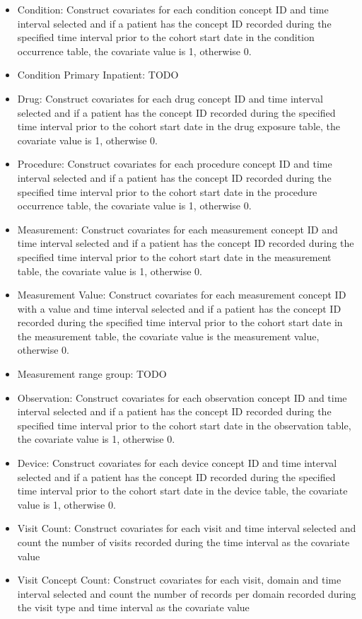 \documentclass[11pt]{book}
\providecommand{\tightlist}{%
  \setlength{\itemsep}{0pt}\setlength{\parskip}{0pt}}
\theoremstyle{definition}
\theoremstyle{definition}
\theoremstyle{definition}
\theoremstyle{remark}
\begin{document}
\begin{itemize}
\tightlist
\item
  Condition: Construct covariates for each condition concept ID and time interval selected and if a patient has the concept ID recorded during the specified time interval prior to the cohort start date in the condition occurrence table, the covariate value is 1, otherwise 0.
\item
  Condition Primary Inpatient: TODO
\item
  Drug: Construct covariates for each drug concept ID and time interval selected and if a patient has the concept ID recorded during the specified time interval prior to the cohort start date in the drug exposure table, the covariate value is 1, otherwise 0.
\item
  Procedure: Construct covariates for each procedure concept ID and time interval selected and if a patient has the concept ID recorded during the specified time interval prior to the cohort start date in the procedure occurrence table, the covariate value is 1, otherwise 0.
\item
  Measurement: Construct covariates for each measurement concept ID and time interval selected and if a patient has the concept ID recorded during the specified time interval prior to the cohort start date in the measurement table, the covariate value is 1, otherwise 0.
\item
  Measurement Value: Construct covariates for each measurement concept ID with a value and time interval selected and if a patient has the concept ID recorded during the specified time interval prior to the cohort start date in the measurement table, the covariate value is the measurement value, otherwise 0.
\item
  Measurement range group: TODO
\item
  Observation: Construct covariates for each observation concept ID and time interval selected and if a patient has the concept ID recorded during the specified time interval prior to the cohort start date in the observation table, the covariate value is 1, otherwise 0.
\item
  Device: Construct covariates for each device concept ID and time interval selected and if a patient has the concept ID recorded during the specified time interval prior to the cohort start date in the device table, the covariate value is 1, otherwise 0.
\item
  Visit Count: Construct covariates for each visit and time interval selected and count the number of visits recorded during the time interval as the covariate value
\item
  Visit Concept Count: Construct covariates for each visit, domain and time interval selected and count the number of records per domain recorded during the visit type and time interval as the covariate value
\end{itemize}
\end{document}
